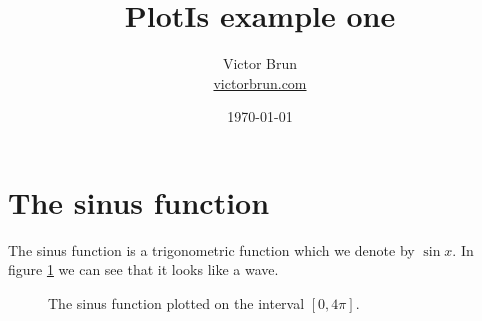 \documentclass[12pt]{article}
\title{PlotIs example one}
\author{Victor Brun\\ \href{https://victorbrun.com}{victorbrun.com}}
\date{\today}
\begin{document}
\maketitle

\section{The sinus function}
The sinus function is a trigonometric function which we denote by $\sin{x}$. In figure \ref{fig:sin} we can see that it looks like a wave.

\begin{figure}[h]
	\centering
	\caption{The sinus function plotted on the interval $[0, 4\pi]$.}
	\label{fig:sin}
\end{figure}
\end{document}
